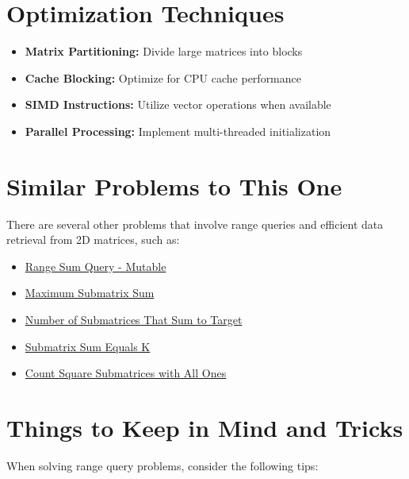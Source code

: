 \section*{Optimization Techniques}
\begin{itemize}
    \item \textbf{Matrix Partitioning:} Divide large matrices into blocks
    \item \textbf{Cache Blocking:} Optimize for CPU cache performance
    \item \textbf{SIMD Instructions:} Utilize vector operations when available
    \item \textbf{Parallel Processing:} Implement multi-threaded initialization
\end{itemize}

\section*{Similar Problems to This One}

There are several other problems that involve range queries and efficient data retrieval from 2D matrices, such as:

\begin{itemize}
    \item \hyperref[problem:range_sum_query_mutable]{Range Sum Query - Mutable}
    \item \hyperref[problem:maximum_submatrix_sum]{Maximum Submatrix Sum}
    \item \hyperref[problem:number_of_submatrices_that_sum_to_target]{Number of Submatrices That Sum to Target}
    \item \hyperref[problem:submatrix_sum_equals_k]{Submatrix Sum Equals K}
    \item \hyperref[problem:count_square_submatrices_with_all_ones]{Count Square Submatrices with All Ones}
\end{itemize}

\section*{Things to Keep in Mind and Tricks}

When solving range query problems, consider the following tips:


